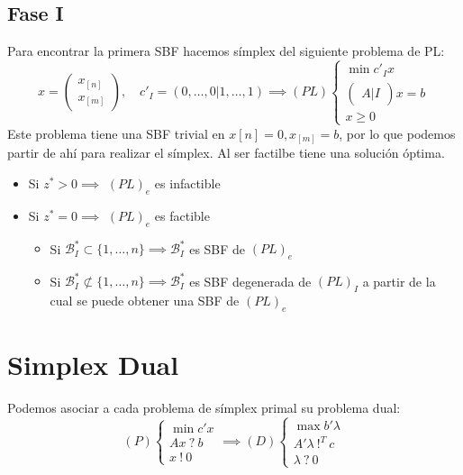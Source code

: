 \documentclass{myclass}
\begin{document}
\subsection{Fase I}
Para encontrar la primera SBF hacemos símplex del siguiente problema de PL:
$$
x = \begin{pmatrix} x_{[n]} \\ x_{[m]} \end{pmatrix}, \quad
c'_I = (0,\ldots,0|1, \ldots, 1)
\implies 
(PL)
\begin{cases}
    \min c'_Ix \\
    \begin{pmatrix} A  |  I \end{pmatrix} x = b \\
    x\geq 0
\end{cases}
$$
Este problema tiene una SBF trivial en $x{[n]} = 0, x_{[m]} = b$, por lo que podemos partir de ahí para realizar el símplex. Al ser factilbe tiene una solución óptima.
\begin{itemize}
    \item Si $z^*>0 \implies$ $(PL)_e$ es infactible
    \item Si $z^*=0 \implies$ $(PL)_e$ es factible
    \begin{itemize}
        \item Si $\mathcal{B}^*_I \subset \{1, \ldots , n\} \implies \mathcal{B}^*_I$ es SBF de $(PL)_e$
        \item Si $\mathcal{B}^*_I \not\subset \{1, \ldots , n\} \implies \mathcal{B}^*_I$ es SBF degenerada de $(PL)_I$ a partir de la cual se puede obtener una SBF de $(PL)_e$
    \end{itemize}
\end{itemize}


\section{Simplex Dual}
Podemos asociar a cada problema de símplex primal su problema dual:
$$
(P)
\begin{cases}
    \min c'x \\
    Ax \ ?\ b \\
    x \ ! \ 0
\end{cases}
\implies
(D)
\begin{cases}
    \max b'\lambda \\
    A'\lambda \ !^T\ c \\
    \lambda \ ? \ 0
\end{cases}
$$
\end{document}
